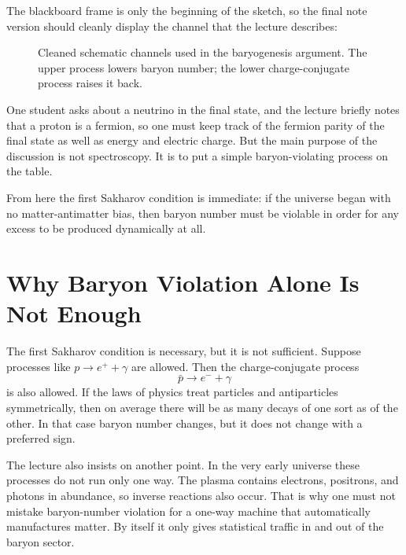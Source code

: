 The blackboard frame is only the beginning of the sketch, so the final note version should cleanly display the channel that the lecture describes:

\begin{figure}
\centering
{}
\caption{Cleaned schematic channels used in the baryogenesis argument. The upper process lowers baryon number; the lower charge-conjugate process raises it back.}
\end{figure}

One student asks about a neutrino in the final state, and the lecture briefly notes that a proton is a fermion, so one must keep track of the fermion parity of the final state as well as energy and electric charge. But the main purpose of the discussion is not spectroscopy. It is to put a simple baryon-violating process on the table.

From here the first Sakharov condition is immediate: if the universe began with no matter-antimatter bias, then baryon number must be violable in order for any excess to be produced dynamically at all.

\section{Why Baryon Violation Alone Is Not Enough}

The first Sakharov condition is necessary, but it is not sufficient. Suppose processes like \(p\to e^+ + \gamma\) are allowed. Then the charge-conjugate process
\begin{equation}
\bar p \to e^- + \gamma
\end{equation}
is also allowed. If the laws of physics treat particles and antiparticles symmetrically, then on average there will be as many decays of one sort as of the other. In that case baryon number changes, but it does not change with a preferred sign.

The lecture also insists on another point. In the very early universe these processes do not run only one way. The plasma contains electrons, positrons, and photons in abundance, so inverse reactions also occur. That is why one must not mistake baryon-number violation for a one-way machine that automatically manufactures matter. By itself it only gives statistical traffic in and out of the baryon sector.

